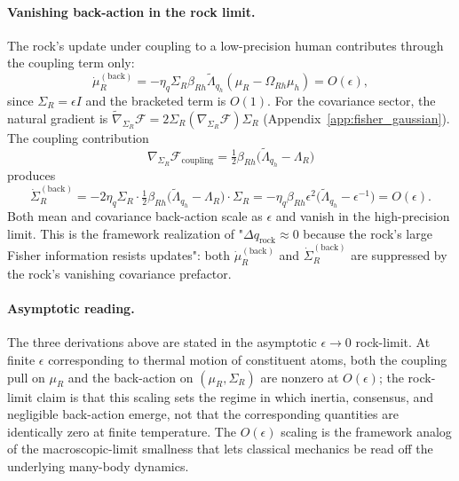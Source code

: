 \documentclass[11pt]{article}
\begin{document}
\paragraph{Vanishing back-action in the rock limit.} The rock's update under coupling to a low-precision human contributes through the coupling term only:
\begin{equation}
\dot{\mu}_R^{(\mathrm{back})} = -\eta_q \Sigma_R \beta_{Rh} \tilde{\Lambda}_{q_h}(\mu_R - \Omega_{Rh}\mu_h) = O(\epsilon),
\label{eq:rock_back_mu}
\end{equation}
since $\Sigma_R = \epsilon I$ and the bracketed term is $O(1)$. For the covariance sector, the natural gradient is $\tilde{\nabla}_{\Sigma_R}\mathcal{F} = 2\Sigma_R(\nabla_{\Sigma_R}\mathcal{F})\Sigma_R$ (Appendix~\ref{app:fisher_gaussian}). The coupling contribution
\begin{equation}
\nabla_{\Sigma_R}\mathcal{F}_{\mathrm{coupling}} = \tfrac{1}{2}\beta_{Rh}\big(\tilde{\Lambda}_{q_h} - \Lambda_R\big)
\end{equation}
produces
\begin{equation}
\dot{\Sigma}_R^{(\mathrm{back})} = -2\eta_q \Sigma_R \cdot \tfrac{1}{2}\beta_{Rh}\big(\tilde{\Lambda}_{q_h} - \Lambda_R\big)\cdot \Sigma_R = -\eta_q \beta_{Rh} \epsilon^2 \big(\tilde{\Lambda}_{q_h} - \epsilon^{-1}\big) = O(\epsilon).
\label{eq:rock_back_sigma}
\end{equation}
Both mean and covariance back-action scale as $\epsilon$ and vanish in the high-precision limit. This is the framework realization of "$\Delta q_{\mathrm{rock}} \approx 0$ because the rock's large Fisher information resists updates": both $\dot{\mu}_R^{(\mathrm{back})}$ and $\dot{\Sigma}_R^{(\mathrm{back})}$ are suppressed by the rock's vanishing covariance prefactor.

\paragraph{Asymptotic reading.} The three derivations above are stated in the asymptotic $\epsilon \to 0$ rock-limit. At finite $\epsilon$ corresponding to thermal motion of constituent atoms, both the coupling pull on $\mu_R$ and the back-action on $(\mu_R, \Sigma_R)$ are nonzero at $O(\epsilon)$; the rock-limit claim is that this scaling sets the regime in which inertia, consensus, and negligible back-action emerge, not that the corresponding quantities are identically zero at finite temperature. The $O(\epsilon)$ scaling is the framework analog of the macroscopic-limit smallness that lets classical mechanics be read off the underlying many-body dynamics.
\end{document}
